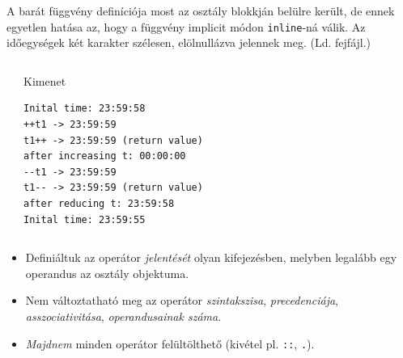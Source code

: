 \documentclass[usenames,dvipsnames,aspectratio=169]{beamer}
\begin{document}
\begin{frame}
    \begin{exampleblock}{}
        \scriptsize
        
    \end{exampleblock}
    \vfill
    A barát függvény definíciója most az osztály blokkján belülre került, de ennek egyetlen hatása
    az, hogy a függvény implicit módon \texttt{inline}-ná válik. Az időegységek két karakter szélesen, 
    elölnullázva jelennek meg. (Ld.  fejfájl.)
\end{frame}

\begin{frame}[fragile]
    \begin{columns}[T]
            \begin{exampleblock}{}
                \vspace{-.2cm}
                
                \vspace{-.2cm}
            \end{exampleblock}
            \begin{block}{Kimenet}
                \vspace{-.3cm}
                \begin{verbatim}
Inital time: 23:59:58
++t1 -> 23:59:59
t1++ -> 23:59:59 (return value)
after increasing t: 00:00:00
--t1 -> 23:59:59
t1-- -> 23:59:59 (return value)
after reducing t: 23:59:58
Inital time: 23:59:55
\end{verbatim}             
                \vspace{-.3cm}
            \end{block}
    \end{columns}
\end{frame}

\begin{frame}
    \begin{itemize}
        \item Definiáltuk az operátor \emph{jelentését} olyan kifejezésben, melyben legalább egy operandus az osztály objektuma.
        \item Nem változtatható meg az operátor \emph{szintakszisa}, \emph{precedenciája}, \emph{asszociativitása}, \emph{operandusainak száma}.
        \item \emph{Majdnem} minden operátor felültölthető (kivétel pl. \texttt{::}, \texttt{.}).
    \end{itemize}
\end{frame}
\end{document}
